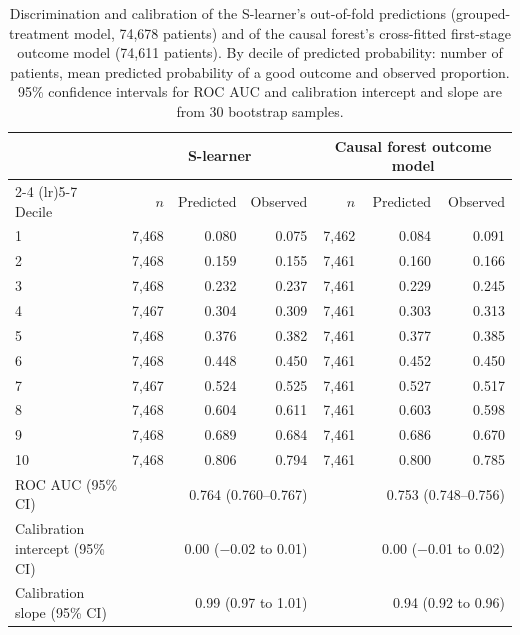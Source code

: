 \begin{table}[htbp]
\centering
\footnotesize
\caption{Discrimination and calibration of the S-learner's out-of-fold predictions (grouped-treatment model, 74,678 patients) and of the causal forest's cross-fitted first-stage outcome model (74,611 patients). By decile of predicted probability: number of patients, mean predicted probability of a good outcome and observed proportion. 95\% confidence intervals for ROC AUC and calibration intercept and slope are from 30 bootstrap samples.}
\label{tab:calibration}
\begin{tabular}{@{}lrrrrrr@{}}
\toprule
& \multicolumn{3}{c}{S-learner} & \multicolumn{3}{c}{Causal forest outcome model} \\
\cmidrule(lr){2-4} \cmidrule(lr){5-7}
Decile & $n$ & Predicted & Observed & $n$ & Predicted & Observed \\
\midrule
1 & 7,468 & 0.080 & 0.075 & 7,462 & 0.084 & 0.091 \\
2 & 7,468 & 0.159 & 0.155 & 7,461 & 0.160 & 0.166 \\
3 & 7,468 & 0.232 & 0.237 & 7,461 & 0.229 & 0.245 \\
4 & 7,467 & 0.304 & 0.309 & 7,461 & 0.303 & 0.313 \\
5 & 7,468 & 0.376 & 0.382 & 7,461 & 0.377 & 0.385 \\
6 & 7,468 & 0.448 & 0.450 & 7,461 & 0.452 & 0.450 \\
7 & 7,467 & 0.524 & 0.525 & 7,461 & 0.527 & 0.517 \\
8 & 7,468 & 0.604 & 0.611 & 7,461 & 0.603 & 0.598 \\
9 & 7,468 & 0.689 & 0.684 & 7,461 & 0.686 & 0.670 \\
10 & 7,468 & 0.806 & 0.794 & 7,461 & 0.800 & 0.785 \\
\addlinespace
ROC AUC (95\% CI) & \multicolumn{3}{r}{0.764 (0.760--0.767)} & \multicolumn{3}{r}{0.753 (0.748--0.756)} \\
Calibration intercept (95\% CI) & \multicolumn{3}{r}{0.00 ($-$0.02 to 0.01)} & \multicolumn{3}{r}{0.00 ($-$0.01 to 0.02)} \\
Calibration slope (95\% CI) & \multicolumn{3}{r}{0.99 (0.97 to 1.01)} & \multicolumn{3}{r}{0.94 (0.92 to 0.96)} \\
\bottomrule
\end{tabular}
\end{table}


